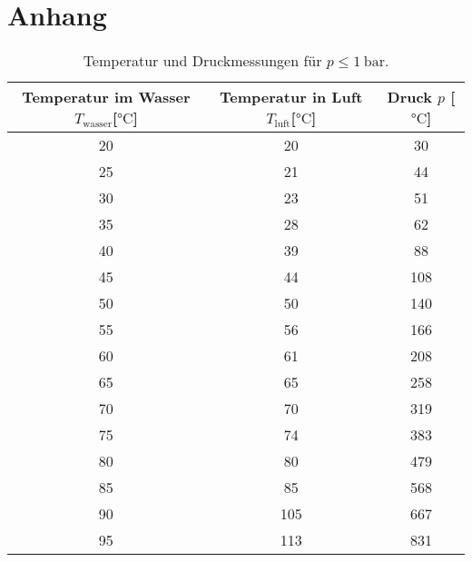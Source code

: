 \section{Anhang}

\begin{table}
    \centering
    \caption{Temperatur und Druckmessungen für $p \leq \SI{1}{\bar}$.}
    \label{tab:ndd}
    \begin{tabular}{c c c}
        \toprule
        Temperatur im Wasser $T_{\text{wasser}}$[$\si{\celsius}$] & Temperatur in Luft $T_{\text{luft}}$[$\si{\celsius}$]  & Druck $p$ [$\si{\celsius}$]\\
        \midrule
        20  & 20  & 30 \\
        25  & 21  & 44 \\
        30  & 23  & 51 \\
        35  & 28  & 62 \\
        40  & 39  & 88 \\
        45  & 44  & 108 \\
        50  & 50  & 140 \\
        55  & 56  & 166 \\
        60  & 61  & 208 \\
        65  & 65  & 258 \\
        70  & 70  & 319 \\
        75  & 74  & 383 \\
        80  & 80  & 479 \\
        85  & 85  & 568 \\
        90  & 105  & 667 \\
        95  & 113  & 831 \\
        \bottomrule
    \end{tabular}
    \end{table}
    
